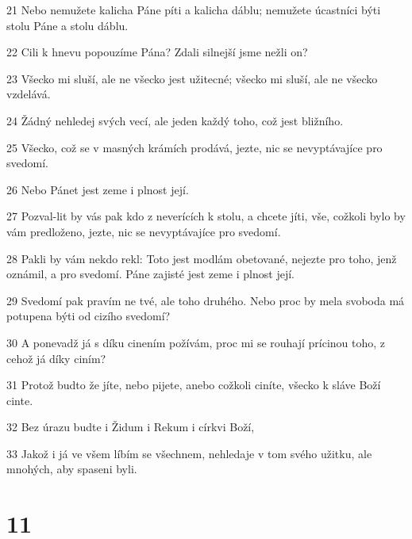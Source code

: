 \par 21 Nebo nemužete kalicha Páne píti a kalicha dáblu; nemužete úcastníci býti stolu Páne a stolu dáblu.
\par 22 Cili k hnevu popouzíme Pána? Zdali silnejší jsme nežli on?
\par 23 Všecko mi sluší, ale ne všecko jest užitecné; všecko mi sluší, ale ne všecko vzdelává.
\par 24 Žádný nehledej svých vecí, ale jeden každý toho, což jest bližního.
\par 25 Všecko, což se v masných krámích prodává, jezte, nic se nevyptávajíce pro svedomí.
\par 26 Nebo Pánet jest zeme i plnost její.
\par 27 Pozval-lit by vás pak kdo z neverících k stolu, a chcete jíti, vše, cožkoli bylo by vám predloženo, jezte, nic se nevyptávajíce pro svedomí.
\par 28 Pakli by vám nekdo rekl: Toto jest modlám obetované, nejezte pro toho, jenž oznámil, a pro svedomí. Páne zajisté jest zeme i plnost její.
\par 29 Svedomí pak pravím ne tvé, ale toho druhého. Nebo proc by mela svoboda má potupena býti od cizího svedomí?
\par 30 A ponevadž já s díku cinením požívám, proc mi se rouhají prícinou toho, z cehož já díky ciním?
\par 31 Protož budto že jíte, nebo pijete, anebo cožkoli ciníte, všecko k sláve Boží cinte.
\par 32 Bez úrazu budte i Židum i Rekum i církvi Boží,
\par 33 Jakož i já ve všem líbím se všechnem, nehledaje v tom svého užitku, ale mnohých, aby spaseni byli.

\chapter{11}

